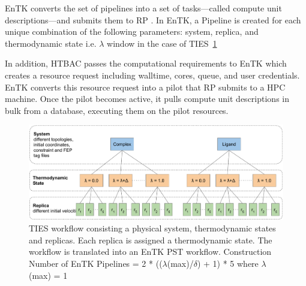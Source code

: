 EnTK converts the set of pipelines into a set of tasks---called compute unit
descriptions---and submits them to RP . In EnTK, a
Pipeline is created for each unique combination of the following parameters:
system, replica, and thermodynamic state i.e. $\lambda$ window in the case of
TIES~\ref{fig:ties_workflow} 

In addition, HTBAC passes the computational requirements  to
EnTK which creates a resource request including walltime, cores, queue, and
user credentials. EnTK converts this resource request into a pilot that RP
submits to a HPC machine. Once the pilot becomes active, it pulls compute
unit descriptions in bulk from a database, executing them on the pilot
resources.

\begin{figure}
  \centering
  \includegraphics[width=\columnwidth]{figures/ties_workflow.pdf}
  \caption{TIES workflow consisting a physical system, thermodynamic states
  and replicas. Each replica is assigned a thermodynamic state. The workflow
  is translated into an EnTK PST workflow. Construction Number of EnTK
  Pipelines = 2 * (($\lambda$(max)/$\delta$) + 1) * 5 where $\lambda$(max) =
  1 }
\label{fig:ties_workflow}
\end{figure}


